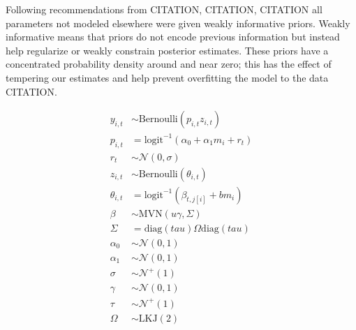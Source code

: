 \documentclass[12pt,letterpaper]{article}
\begin{document}
Following recommendations from CITATION, CITATION, CITATION all parameters not modeled elsewhere were given weakly informative priors. Weakly informative means that priors do not encode previous information but instead help regularize or weakly constrain posterior estimates. These priors have a concentrated probability density around and near zero; this has the effect of tempering our estimates and help prevent overfitting the model to the data CITATION. 


\begin{equation}
  \begin{aligned}
    y_{i, t} &\sim \text{Bernoulli}(p_{i, t} z_{i, t}) \\
    p_{i, t} &= \text{logit}^{-1}(\alpha_{0} + \alpha_{1} m_{i} + r_{t}) \\ 
    r_{t} &\sim \mathcal{N}(0, \sigma) \\
    z_{i, t} &\sim \text{Bernoulli}(\theta_{i, t}) \\
    \theta_{i, t} &= \text{logit}^{-1}(\beta_{t, j[i]} + b m_{i}) \\
    \beta &\sim \text{MVN}(u \gamma, \Sigma) \\
    \Sigma &= \text{diag}(tau) \Omega \text{diag}(tau) \\
    \alpha_{0} &\sim \mathcal{N}(0, 1) \\
    \alpha_{1} &\sim \mathcal{N}(0, 1) \\
    \sigma &\sim \mathcal{N}^{+}(1) \\
    \gamma &\sim \mathcal{N}(0, 1) \\
    \tau &\sim \mathcal{N}^{+}(1) \\
    \Omega &\sim \text{LKJ}(2) \\
  \end{aligned}
  \label{eq:full}
\end{equation}


\end{document}
